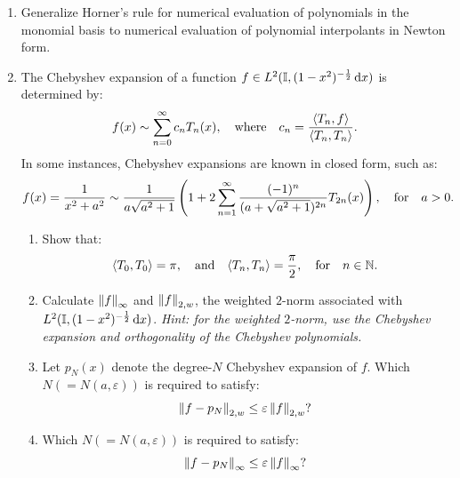 \begin{enumerate}

\item Generalize Horner's rule for numerical evaluation of polynomials in the monomial basis to numerical evaluation of polynomial interpolants in Newton form.
\item The Chebyshev expansion of a function $f\in L^2(\mathbb{I},(1-x^2)^{-\frac{1}{2}}{\rm\,d} x)$ is determined by:
\[
f(x) \sim \sum_{n=0}^\infty c_n T_n(x),\quad{\rm where}\quad c_n = \dfrac{\langle T_n, f\rangle}{\langle T_n, T_n\rangle}.
\]
In some instances, Chebyshev expansions are known in closed form, such as:
\[
f(x) = \dfrac{1}{x^2+a^2} \sim \dfrac{1}{a\sqrt{a^2+1}}\left(1+2\sum_{n=1}^\infty\dfrac{(-1)^n}{(a+\sqrt{a^2+1})^{2n}}T_{2n}(x)\right),\quad{\rm for}\quad a>0.
\]
\begin{enumerate}
\item Show that:
\[
\langle T_0,T_0\rangle = \pi,\quad{\rm and}\quad \langle T_n,T_n\rangle = \dfrac{\pi}{2},\quad{\rm for}\quad n\in\mathbb{N}.
\]
\item Calculate $\left\|{f}\right\|_{\infty}$ and $\left\|{f}\right\|_{2,w}$, the weighted $2$-norm associated with $L^2(\mathbb{I},(1-x^2)^{-\frac{1}{2}}{\rm\,d} x)$. {\em Hint: for the weighted $2$-norm, use the Chebyshev expansion and orthogonality of the Chebyshev polynomials.}
\item Let $p_N(x)$ denote the degree-$N$ Chebyshev expansion of $f$.
Which $N( = N(a,\varepsilon))$ is required to satisfy:
\[
\left\|{f-p_N}\right\|_{2,w} \le \varepsilon\left\|{f}\right\|_{2,w}?
\]
\item Which $N( = N(a,\varepsilon))$ is required to satisfy:
\[
\left\|{f-p_N}\right\|_\infty \le \varepsilon\left\|{f}\right\|_\infty?
\]
\end{enumerate}


\end{enumerate}
